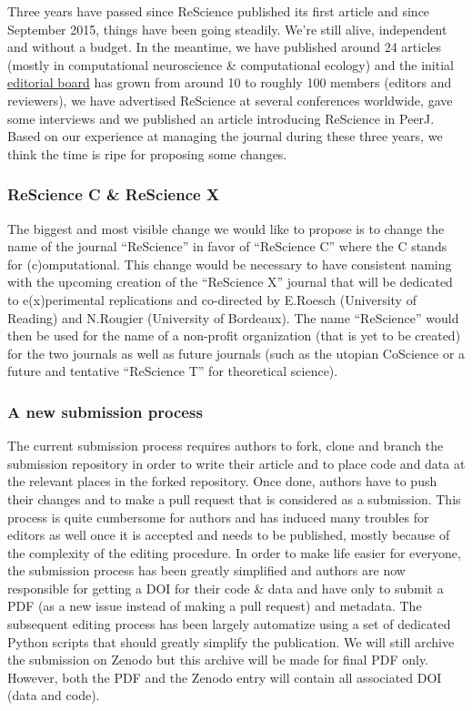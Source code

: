 
Three years have passed since ReScience published its first
article\supercite{Topalidou:2015} and since September 2015, things have been
going steadily. We're still alive, independent and without a budget. In the
meantime, we have published around 24 articles (mostly in computational
neuroscience \& computational ecology) and the initial
\href{https://rescience-c.github.io/board/}{editorial board} has grown from
around 10 to roughly 100 members (editors and reviewers), we have advertised
ReScience at several conferences worldwide, gave some
interviews\supercite{Science:2018} and we published an article introducing
ReScience in PeerJ\supercite{Rougier:2017}. Based on our
experience\supercite{Rougier:2018} at managing the journal during these three
years, we think the time is ripe for proposing some changes.

\subsubsection{ReScience C \& ReScience X}

The biggest and most visible change we would like to propose is to change the
name of the journal ``ReScience'' in favor of ``ReScience C'' where the C
stands for (c)omputational. This change would be necessary to have consistent
naming with the upcoming creation of the ``ReScience X'' journal that will be
dedicated to e(x)perimental replications and co-directed by E.Roesch
(University of Reading) and N.Rougier (University of Bordeaux). The name
``ReScience'' would then be used for the name of a non-profit organization
(that is yet to be created) for the two journals as well as future journals
(such as the utopian CoScience\supercite{Rougier:2017} or a future and
tentative ``ReScience T'' for theoretical science).


\subsubsection{A new submission process}

The current submission process requires authors to fork, clone and branch the
submission repository in order to write their article and to place code and
data at the relevant places in the forked repository. Once done, authors have
to push their changes and to make a pull request that is considered as a
submission. This process is quite cumbersome for authors and has induced many
troubles for editors as well once it is accepted and needs to be published,
mostly because of the complexity of the editing procedure. In order to make
life easier for everyone, the submission process has been greatly simplified
and authors are now responsible for getting a DOI for their code \& data and
have only to submit a PDF (as a new issue instead of making a pull request) and
metadata. The subsequent editing process has been largely automatize using a
set of dedicated Python scripts that should greatly simplify the
publication. We will still archive the submission on Zenodo but this archive
will be made for final PDF only. However, both the PDF and the Zenodo entry
will contain all associated DOI (data and code).


